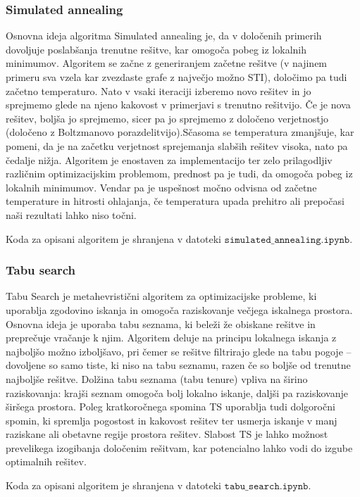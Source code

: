 \documentclass[a4paper,12pt]{article}
\begin{document}
\subsubsection{Simulated annealing}
Osnovna ideja algoritma Simulated annealing je, da v določenih primerih dovoljuje poslabšanja trenutne rešitve, kar omogoča pobeg
iz lokalnih minimumov. Algoritem se začne z generiranjem začetne rešitve (v najinem primeru sva vzela kar zvezdaste grafe z 
največjo možno STI), določimo pa tudi začetno temperaturo. Nato v vsaki iteraciji izberemo novo rešitev in jo sprejmemo glede na 
njeno kakovost v primerjavi s trenutno rešitvijo. Če je nova rešitev, boljša jo sprejmemo, sicer pa jo sprejmemo z določeno 
verjetnostjo (določeno z Boltzmanovo porazdelitvijo).Sčasoma se temperatura zmanjšuje, kar pomeni, da je na začetku verjetnost 
sprejemanja slabših rešitev visoka, nato pa čedalje nižja. Algoritem je enostaven za implementacijo ter zelo prilagodljiv različnim 
optimizacijskim problemom, prednost pa je tudi, da omogoča pobeg iz lokalnih minimumov. Vendar pa je uspešnost močno odvisna od 
začetne temperature in hitrosti ohlajanja, če temperatura upada prehitro ali prepočasi naši rezultati lahko niso točni.

Koda za opisani algoritem je shranjena v datoteki $\texttt{simulated\_annealing.ipynb}$.

\subsubsection{Tabu search}
Tabu Search je metahevristični algoritem za optimizacijske probleme, ki uporablja zgodovino iskanja in omogoča raziskovanje večjega 
iskalnega prostora. Osnovna ideja je uporaba tabu seznama, ki beleži že obiskane rešitve in preprečuje vračanje k njim. Algoritem 
deluje na principu lokalnega iskanja z najboljšo možno izboljšavo, pri čemer se rešitve filtrirajo glede na tabu pogoje – dovoljene 
so samo tiste, ki niso na tabu seznamu, razen če so boljše od trenutne najboljše rešitve. Dolžina tabu seznama (tabu tenure) vpliva 
na širino raziskovanja: krajši seznam omogoča bolj lokalno iskanje, daljši pa raziskovanje širšega prostora. Poleg kratkoročnega spomina 
TS uporablja tudi dolgoročni spomin, ki spremlja pogostost in kakovost rešitev ter usmerja iskanje v manj raziskane ali obetavne regije 
prostora rešitev. Slabost TS je lahko možnost prevelikega izogibanja določenim rešitvam, kar potencialno 
lahko vodi do izgube optimalnih rešitev. 

Koda za opisani algoritem je shranjena v datoteki $\texttt{tabu\_search.ipynb}$.
\end{document}
